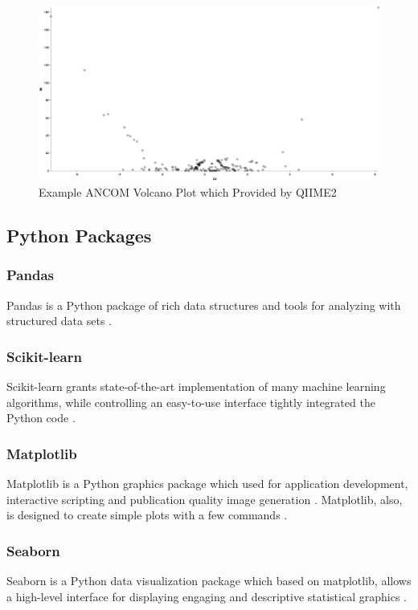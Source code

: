 \documentclass[a4paper]{article}
\begin{document}
                \begin{figure}[p]
                    \centering
                    \includegraphics[width=0.8 \linewidth]{figures/ANCOM/example.png}
                    \caption{Example ANCOM Volcano Plot which Provided by QIIME2 \protect\cite{qiime1, qiime2}}
                    \label{fig:ancom-example}
                \end{figure}

        \subsection{Python Packages}
            \subsubsection{Pandas}
                Pandas is a Python package of rich data structures and tools for analyzing with structured data sets \cite{pandas1}.

            \subsubsection{Scikit-learn}
                Scikit-learn grants state-of-the-art implementation of many machine learning algorithms, while controlling an easy-to-use interface tightly integrated the Python code \cite{sklearn1}.

            \subsubsection{Matplotlib}
                Matplotlib is a Python graphics package which used for application development, interactive scripting and publication quality image generation \cite{matplotlib2}. Matplotlib, also, is designed to create simple plots with a few commands \cite{matplotlib1}.

            \subsubsection{Seaborn}
                Seaborn is a Python data visualization package which based on matplotlib, allows a high-level interface for displaying engaging and descriptive statistical graphics \cite{seaborn1}.
\end{document}
